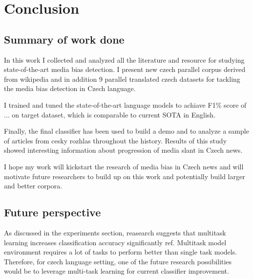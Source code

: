 \chapter{Conclusion}
\section{Summary of work done}
In this work I collected and analyzed all the literature and resource for studying state-of-the-art media bias detection. I present new czech parallel corpus derived from wikipedia and in addition 9 parallel translated czech datasets for tackling the media bias detection in Czech language.

I trained and tuned the state-of-the-art language models to achiave F1\% score of ... on target dataset, which is comparable to current SOTA in English.

Finally, the final classifier has been used to build a demo and to analyze a sample of articles from cesky rozhlas throughout the history. Results of this study showed interesting information about progression of media slant in Czech news.

I hope my work will kickstart the research of media bias in Czech news and will motivate future researchers to build up on this work and potentially build larger and better corpora.
\section{Future perspective}
As discussed in the experiments section, reasearch suggests that multitask learning increases classification accuracy significantly ref. Multitask model environment requires a lot of tasks \cite{aribandi2021ext5} to perform better than single task models. Therefore, for czech language setting, one of the future research possibilities would be to leverage multi-task learning for current classifier improvement. 